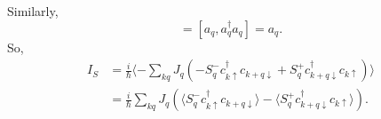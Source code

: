 \documentclass[aps,prb,superscriptaddress]{revtex4-2}
\begin{document}
Similarly,
\begin{equation}
[a_{q}, \sum_{q^{\prime}} a_{q^{\prime}}^{+} a_{q^{\prime}}]=[a_{q}, a_{q}^{\dagger} a_{q}]=a_{q}.
\label{eq:1-1}
\end{equation}
So,
\begin{equation}
\begin{split}
I_{S} &=\frac{i}{\hbar}\langle -\sum_{k q} J_{q}\left(-S_{q}^{-} c_{k \uparrow}^{\dagger} c_{k+q\downarrow} + S_{q}^{+} c_{k+q\downarrow}^{\dagger} c_{k \uparrow}\right) \rangle \\
&= \frac{i}{\hbar} \sum_{k q} J_{q}\left( \langle S_{q}^{-} c_{k \uparrow}^{\dagger} c_{k+q\downarrow}\rangle - \langle S_{q}^{+} c_{k+q\downarrow}^{\dagger} c_{k \uparrow}\rangle \right).
\end{split}
\end{equation}
\end{document}
